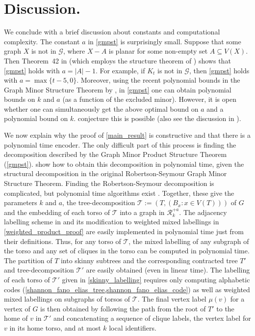 \documentclass[twoside,leqno]{article}
\begin{document}
\section{Discussion.}\label{conclusion}

We conclude with a brief discussion about constants and computational complexity.  The constant $a$ in \cref{gmpst} is surprisingly small. Suppose that some graph $X$ is not in $\mathcal{G}$, where $X-A$ is planar for some non-empty set $A\subseteq V(X)$. Then Theorem~42 in \citep{dujmovic.joret.ea:planar} (which employs the structure theorem of \citet{DvoTho}) shows that \cref{gmpst} holds with $a=|A|-1$. For example, if $K_t$ is not in $\mathcal{G}$, then \cref{gmpst} holds with $a=\max\{t-5,0\}$. Moreover, using the recent polynomial bounds in the Graph Minor Structure Theorem by \citet{gorsky2025polynomial}, in \cref{gmpst} one can obtain polynomial bounds on $k$ and $a$ (as a function of the excluded minor). However, it is open whether one can simultaneously get the above optimal bound on $a$ and a polynomial bound on $k$. \citet[Conjecture~18.9]{gorsky2025polynomial} conjecture this is possible (also see the discussion in \citep{GSW26}).

We now explain why the proof of \cref{main_result} is constructive and that there is a polynomial time encoder.  The only difficult part of this process is finding the decomposition described by the Graph Minor Product Structure Theorem (\cref{gmpst}).  \citet{dujmovic.joret.ea:planar} show how to obtain this decomposition in polynomial time, given the structural decomposition in the original Robertson-Seymour Graph Minor Structure Theorem. Finding the Robertson-Seymour decomposition is complicated, but polynomial time algorithms exist \cite{kawarabayashi2018flat,kawarabayashi2020new,gorsky2025polynomial,demaine2005algorithmic}.  Together, these give the parameters $k$ and $a$, the tree-decomposition $\mathcal{T}:=(T, (B_x:x\in V(T)))$ of $G$ and the embedding of each torso of $\mathcal{T}$ into a graph in $\mathcal{R}_k^{+a}$. The adjacency labelling scheme in \cite{dujmovic.esperet.ea:adjacency} and its modification to weighted mixed labellings in \cref{weighted_product_proof} are easily implemented in polynomial time just from their definitions.  Thus, for any torso of $\mathcal{T}$, the mixed labelling of any subgraph of the torso and any set of cliques in the torso can be computed in polynomial time.  The partition of $T$ into skinny subtrees and the corresponding contracted tree $T'$ and tree-decomposition $\mathcal{T}'$ are easily obtained (even in linear time).  The labelling of each torso of $\mathcal{T}'$ given in \cref{skinny_labelling} requires only computing  alphabetic codes (\cref{shannon_fano_elias_tree,shannon_fano_elias_code}) as well as weighted mixed labellings on subgraphs of torsos of $\mathcal{T}$.  The final vertex label $\mu(v)$ for a vertex of $G$ is then obtained by following the path from the root of $T'$ to the home of $v$ in $\mathcal{T}'$ and concatenating a sequence of clique labels, the vertex label for $v$ in its home torso, and at most $k$ local identifiers.
\end{document}
